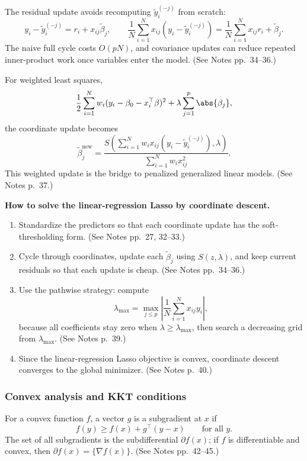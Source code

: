 The residual update avoids recomputing $\tilde y_i^{(-j)}$ from scratch:
\[
y_i-\tilde y_i^{(-j)}=r_i+x_{ij}\tilde\beta_j,
\qquad
\frac{1}{N}\sum_{i=1}^N x_{ij}(y_i-\tilde y_i^{(-j)})
=\frac{1}{N}\sum_{i=1}^N x_{ij}r_i+\tilde\beta_j.
\]
The naive full cycle costs $O(pN)$, and covariance updates can reduce repeated inner-product work once variables enter the model. (See Notes pp.~34--36.)

For weighted least squares,
\[
\frac{1}{2}\sum_{i=1}^N w_i(y_i-\beta_0-x_i^\top\beta)^2
+\lambda\sum_{j=1}^p\abs{\beta_j},
\]
the coordinate update becomes
\[
\tilde\beta_j^{\mathrm{new}}
=
\frac{
S\left(\sum_{i=1}^N w_i x_{ij}(y_i-\tilde y_i^{(-j)}),\lambda\right)
}{
\sum_{i=1}^N w_i x_{ij}^2
}.
\]
This weighted update is the bridge to penalized generalized linear models. (See Notes p.~37.)

\begin{mybox}
\textbf{How to solve the linear-regression Lasso by coordinate descent.}
\begin{enumerate}
    \item Standardize the predictors so that each coordinate update has the soft-thresholding form. (See Notes pp.~27, 32--33.)
    \item Cycle through coordinates, update each $\tilde\beta_j$ using $S(z,\lambda)$, and keep current residuals so that each update is cheap. (See Notes pp.~34--36.)
    \item Use the pathwise strategy: compute
    \[
    \lambda_{\max}
    =\max_{j\le p}\left|\frac{1}{N}\sum_{i=1}^N x_{ij}y_i\right|,
    \]
    because all coefficients stay zero when $\lambda\ge\lambda_{\max}$, then search a decreasing grid from $\lambda_{\max}$. (See Notes p.~39.)
    \item Since the linear-regression Lasso objective is convex, coordinate descent converges to the global minimizer. (See Notes p.~40.)
\end{enumerate}
\end{mybox}

\subsubsection{Convex analysis and KKT conditions}
For a convex function $f$, a vector $g$ is a subgradient at $x$ if
\[
f(y)\ge f(x)+g^\top(y-x)\qquad \text{for all }y.
\]
The set of all subgradients is the subdifferential $\partial f(x)$; if $f$ is differentiable and convex, then $\partial f(x)=\{\nabla f(x)\}$. (See Notes pp.~42--45.)

